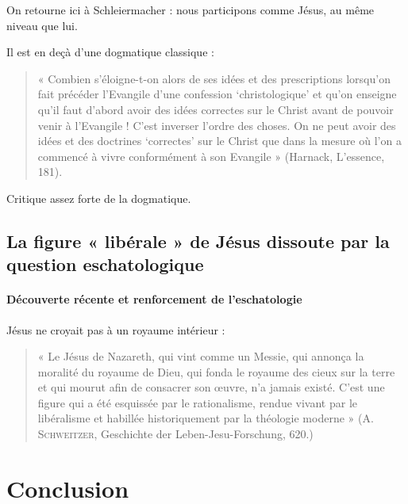 On retourne ici à Schleiermacher : nous participons comme Jésus, au même niveau que lui.  

Il est en deçà d'une dogmatique classique : 
\begin{quote}
    « Combien s’éloigne-t-on alors de ses idées et des prescriptions lorsqu’on fait précéder l’Evangile d’une confession ‘christologique’ et qu’on enseigne qu’il faut d’abord avoir des idées correctes sur le Christ avant de pouvoir venir à l’Evangile ! C’est inverser l’ordre des choses. On ne peut avoir des idées et des doctrines ‘correctes’ sur le Christ que dans la mesure où l’on a commencé à vivre conformément à son Evangile » (Harnack, L’essence, 181).
\end{quote}

Critique assez forte de la dogmatique.


\subsection{La figure « libérale » de Jésus dissoute par la question eschatologique}  

\paragraph{Découverte récente et renforcement de l'eschatologie} Jésus ne croyait pas à un royaume intérieur :

\begin{quote}
    « Le Jésus de Nazareth, qui vint comme un Messie, qui annonça la moralité du royaume de Dieu, qui fonda le royaume des cieux sur la terre et qui mourut afin de consacrer son œuvre, n’a jamais existé. C’est une figure qui a été esquissée par le rationalisme, rendue vivant par le libéralisme et habillée historiquement par la théologie moderne » (A. \textsc{Schweitzer}, Geschichte der Leben-Jesu-Forschung, 620.)
\end{quote}
\section{Conclusion}






 
